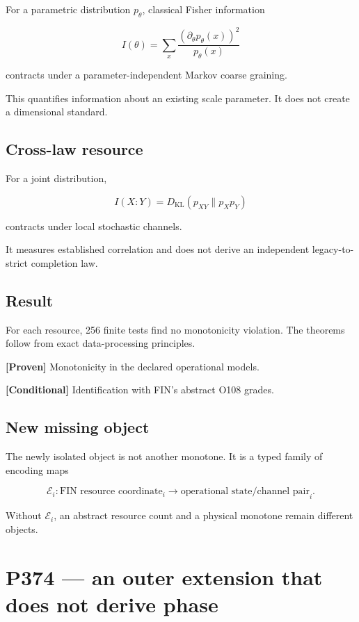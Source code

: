 \documentclass[11pt,a4paper,openany]{report}
\newcommand{\statusProven}{\textcolor{fingreen}{[Proven]}}
\begin{document}
For a parametric distribution \(p_\theta\), classical Fisher information

\[
I(\theta)=
\sum_x
\frac{(\partial_\theta p_\theta(x))^2}{p_\theta(x)}
\]

contracts under a parameter-independent Markov coarse graining.

This quantifies information about an existing scale parameter. It does not create a dimensional standard.

\section{Cross-law resource}

For a joint distribution,

\[
I(X:Y)=
D_{\mathrm{KL}}(p_{XY}\|p_Xp_Y)
\]

contracts under local stochastic channels.

It measures established correlation and does not derive an independent legacy-to-strict completion law.

\section{Result}

For each resource, 256 finite tests find no monotonicity violation. The theorems follow from exact data-processing principles.

\textbf{\statusProven{}} Monotonicity in the declared operational models.

\textbf{[Conditional]} Identification with FIN's abstract O108 grades.

\section{New missing object}

The newly isolated object is not another monotone. It is a typed family of encoding maps

\[
\mathcal E_i:
\text{FIN resource coordinate}_i
\longrightarrow
\text{operational state/channel pair}_i.
\]

Without \(\mathcal E_i\), an abstract resource count and a physical monotone remain different objects.

\chapter{P374 --- an outer extension that does not derive phase}
\end{document}
